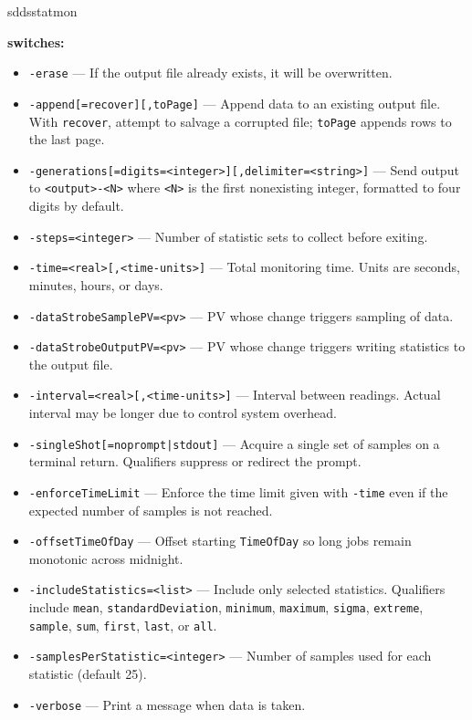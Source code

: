 \begin{sddsprog}{sddsstatmon}
\item {\bf switches:}
    \begin{itemize}
        \item {\tt -erase} --- If the output file already exists, it will be overwritten.
        \item {\tt -append[=recover][,toPage]} --- Append data to an existing output file. With \verb+recover+, attempt to salvage a corrupted file; \verb+toPage+ appends rows to the last page.
        \item {\verb+-generations[=digits=<integer>][,delimiter=<string>]+} --- Send output to \verb+<output>-<N>+ where \verb+<N>+ is the first nonexisting integer, formatted to four digits by default.
        \item {\tt -steps=<integer>} --- Number of statistic sets to collect before exiting.
        \item {\tt -time=<real>[,<time-units>]} --- Total monitoring time. Units are seconds, minutes, hours, or days.
        \item {\tt -dataStrobeSamplePV=<pv>} --- PV whose change triggers sampling of data.
        \item {\tt -dataStrobeOutputPV=<pv>} --- PV whose change triggers writing statistics to the output file.
        \item {\tt -interval=<real>[,<time-units>]} --- Interval between readings. Actual interval may be longer due to control system overhead.
        \item {\tt -singleShot[={noprompt|stdout}]} --- Acquire a single set of samples on a terminal return. Qualifiers suppress or redirect the prompt.
        \item {\tt -enforceTimeLimit} --- Enforce the time limit given with \verb+-time+ even if the expected number of samples is not reached.
        \item {\tt -offsetTimeOfDay} --- Offset starting \verb+TimeOfDay+ so long jobs remain monotonic across midnight.
        \item {\tt -includeStatistics=<list>} --- Include only selected statistics. Qualifiers include \verb+mean+, \verb+standardDeviation+, \verb+minimum+, \verb+maximum+, \verb+sigma+, \verb+extreme+, \verb+sample+, \verb+sum+, \verb+first+, \verb+last+, or \verb+all+.
        \item {\tt -samplesPerStatistic=<integer>} --- Number of samples used for each statistic (default 25).
        \item {\tt -verbose} --- Print a message when data is taken.

\end{itemize}
\end{sddsprog}
